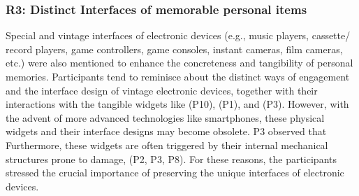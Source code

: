 \subsubsection{R3: Distinct Interfaces of memorable personal items}
Special and vintage interfaces of electronic devices (e.g., music players, cassette/ record players, game controllers, game consoles, instant cameras, film cameras, etc.) were also mentioned to enhance the concreteness and tangibility of personal memories.
Participants tend to reminisce about the distinct ways of engagement and the interface design of vintage electronic devices, together with their interactions with the tangible widgets like  (P10),  (P1), and  (P3). 
However, with the advent of more advanced technologies like smartphones, these physical widgets and their interface designs may become obsolete. 
P3 observed that 
Furthermore, these widgets are often triggered by their internal mechanical structures prone to damage,  (P2, P3, P8). 
For these reasons, the participants stressed the crucial importance of preserving the unique interfaces of electronic devices. 


